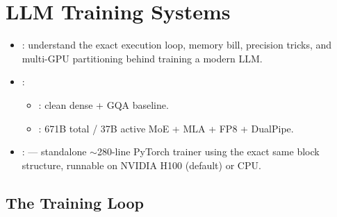 \chapter{LLM Training Systems}

\begin{itemize}
    \item {}: understand the exact execution loop, memory bill, precision tricks, and multi-GPU partitioning behind training a modern LLM.
    \item {}:
    \begin{itemize}
        \item {}: clean dense + GQA baseline.
        \item {}: 671B total / 37B active MoE + MLA + FP8 + DualPipe.
    \end{itemize}
    \item {}:  --- standalone $\sim$280-line PyTorch trainer using the exact same block structure, runnable on NVIDIA H100 (default) or CPU.
\end{itemize}

\section{The Training Loop}

